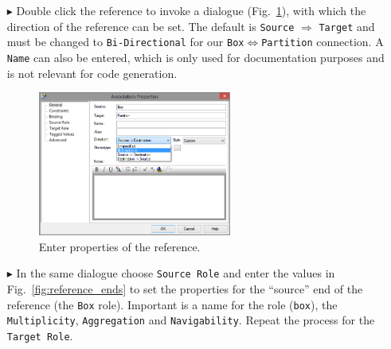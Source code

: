 \begin{enumerate}
\item[$\blacktriangleright$] Double click the reference to invoke a dialogue (Fig.~\ref{fig:ereference_properties}), with which the direction of the reference can be set.
The default is \texttt{Source} $\Rightarrow$ \texttt{Target} and must be changed to \texttt{Bi-Directional} for our \texttt{Box}$\Leftrightarrow$\texttt{Partition} connection.
A \texttt{Name} can also be entered, which is only used for documentation purposes and is not relevant for code generation.

\begin{figure}[htbp]
	\centering
  \includegraphics[width=0.6\textwidth]{pics/memBoxBilder/memBox25.png}
	\caption{Enter properties of the reference.}
	\label{fig:ereference_properties}
\end{figure}

\item[$\blacktriangleright$] In the same dialogue choose \texttt{Source Role} and enter the values in Fig.~\ref{fig:reference_ends} to set the properties for the ``source'' end of the reference (the \texttt{Box} role).
Important is a name for the role (\texttt{box}), the \texttt{Multiplicity}, \texttt{Aggregation} and \texttt{Navigability}.  Repeat the process for the \texttt{Target Role}.


\end{enumerate}
